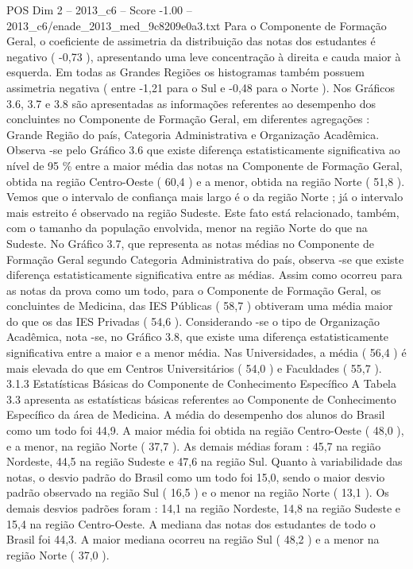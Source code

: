 \begin{textsample}{POS Dim 2 – 2013\_c6 – Score -1.00 – 2013\_c6/enade\_2013\_med\_9c8209e0a3.txt}
Para o Componente de Formação Geral, o coeficiente de assimetria da distribuição das notas dos estudantes é negativo ( -0,73 ), apresentando uma leve concentração à direita e cauda maior à esquerda.
Em todas as Grandes Regiões os histogramas também possuem assimetria negativa ( entre -1,21 para o Sul e -0,48 para o Norte ).
Nos Gráficos 3.6, 3.7 e 3.8 são apresentadas as informações referentes ao desempenho dos concluintes no Componente de Formação Geral, em diferentes agregações : Grande Região do país, Categoria Administrativa e Organização Acadêmica.
Observa -se pelo Gráfico 3.6 que existe diferença estatisticamente significativa ao nível de 95 \% entre a maior média das notas na Componente de Formação Geral, obtida na região Centro-Oeste ( 60,4 ) e a menor, obtida na região Norte ( 51,8 ).
Vemos que o intervalo de confiança mais largo é o da região Norte ; já o intervalo mais estreito é observado na região Sudeste.
Este fato está relacionado, também, com o tamanho da população envolvida, menor na região Norte do que na Sudeste.
No Gráfico 3.7, que representa as notas médias no Componente de Formação Geral segundo Categoria Administrativa do país, observa -se que existe diferença estatisticamente significativa entre as médias.
Assim como ocorreu para as notas da prova como um todo, para o Componente de Formação Geral, os concluintes de Medicina, das IES Públicas ( 58,7 ) obtiveram uma média maior do que os das IES Privadas ( 54,6 ).
Considerando -se o tipo de Organização Acadêmica, nota -se, no Gráfico 3.8, que existe uma diferença estatisticamente significativa entre a maior e a menor média.
Nas Universidades, a média ( 56,4 ) é mais elevada do que em Centros Universitários ( 54,0 ) e Faculdades ( 55,7 ). 3.1.3 Estatísticas Básicas do Componente de Conhecimento Específico A Tabela 3.3 apresenta as estatísticas básicas referentes ao Componente de Conhecimento Específico da área de Medicina.
A média do desempenho dos alunos do Brasil como um todo foi 44,9.
A maior média foi obtida na região Centro-Oeste ( 48,0 ), e a menor, na região Norte ( 37,7 ).
As demais médias foram : 45,7 na região Nordeste, 44,5 na região Sudeste e 47,6 na região Sul.
Quanto à variabilidade das notas, o desvio padrão do Brasil como um todo foi 15,0, sendo o maior desvio padrão observado na região Sul ( 16,5 ) e o menor na região Norte ( 13,1 ).
Os demais desvios padrões foram : 14,1 na região Nordeste, 14,8 na região Sudeste e 15,4 na região Centro-Oeste.
A mediana das notas dos estudantes de todo o Brasil foi 44,3.
A maior mediana ocorreu na região Sul ( 48,2 ) e a menor na região Norte ( 37,0 ).

\end{textsample}
